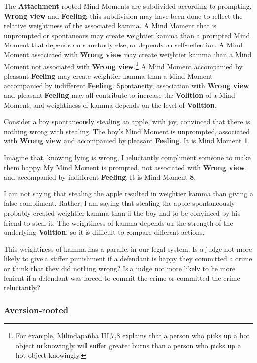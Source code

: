 The \textbf{Attachment}-rooted Mind Moments are subdivided according to prompting, \textbf{Wrong view} and \textbf{Feeling}; this subdivision may have been done to reflect the relative weightiness of the associated kamma. A Mind Moment that is unprompted or spontaneous may create weightier kamma than a prompted Mind Moment that depends on somebody else, or depends on self-reflection. A Mind Moment associated with \textbf{Wrong view} may create weightier kamma than a Mind Moment not associated with \textbf{Wrong view}.\footnote{For example, Milindapañha III,7,8 explains that a person who picks up a hot object unknowingly will suffer greater burns than a person who picks up a hot object knowingly.} A Mind Moment accompanied by pleasant \textbf{Feeling} may create weightier kamma than a Mind Moment accompanied by indifferent \textbf{Feeling}. Spontaneity, association with \textbf{Wrong view} and pleasant \textbf{Feeling} may all contribute to increase the \textbf{Volition} of a Mind Moment, and weightiness of kamma depends on the level of \textbf{Volition}.

\pagebreak

Consider a boy spontaneously stealing an apple, with joy, convinced that there is nothing wrong with stealing. The boy’s Mind Moment is unprompted, associated with \textbf{Wrong view} and accompanied by pleasant \textbf{Feeling}. It is Mind Moment \textbf{1}.

Imagine that, knowing lying is wrong, I reluctantly compliment someone to make them happy. My Mind Moment is prompted, not associated with \textbf{Wrong view}, and accompanied by indifferent \textbf{Feeling}. It is Mind Moment \textbf{8}.

I am not saying that stealing the apple resulted in weightier kamma than giving a false compliment. Rather, I am saying that stealing the apple spontaneously probably created weightier kamma than if the boy had to be convinced by his friend to steal it. The weightiness of kamma depends on the strength of the underlying \textbf{Volition}, so it is difficult to compare different actions.

This weightiness of kamma has a parallel in our legal system. Is a judge not more likely to give a stiffer punishment if a defendant is happy they committed a crime or think that they did nothing wrong? Is a judge not more likely to be more lenient if a defendant was forced to commit the crime or committed the crime reluctantly?

\subsubsection*{\textbf{Aversion}-rooted}

